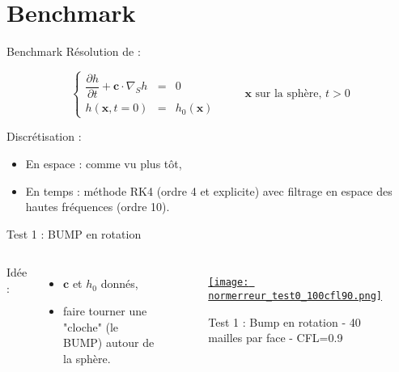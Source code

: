\documentclass[11pt]{beamer}
\begin{document}
\section{Benchmark}
\begin{frame}{Benchmark}
Résolution de :

$$\left\{
\begin{array}{rcl}
\dfrac{\partial h}{\partial t} + \mathbf{c} \cdot \nabla_S h & = & 0 \\
h(\mathbf{x},t=0) & = & h_0 ( \mathbf{x} )
\end{array}
\right. \hspace{1cm} \mathbf{x} \text{ sur la sphère, } t>0$$

\pause

\begin{block}{Discrétisation : }

\begin{itemize}
\item En espace : comme vu plus tôt,

\item En temps : méthode RK4 (ordre 4 et explicite) avec filtrage en espace des hautes fréquences (ordre 10).
\end{itemize}
\end{block}

\end{frame}


\begin{frame}{Test 1 : BUMP en rotation}
\begin{columns}
Idée :

\begin{itemize}
\item $\mathbf{c}$ et $h_0$ donnés,

\item faire tourner une "cloche" (le BUMP) autour de la sphère.
\end{itemize}



\begin{figure}
\href{run:CSapprox_test0.avi}{\texttt{[image: normerreur\_test0\_100cfl90.png]}} 
\caption{Test 1 : Bump en rotation - 40 mailles par face - CFL=0.9}
\end{figure}

\end{columns}
\end{frame}

\end{document}
